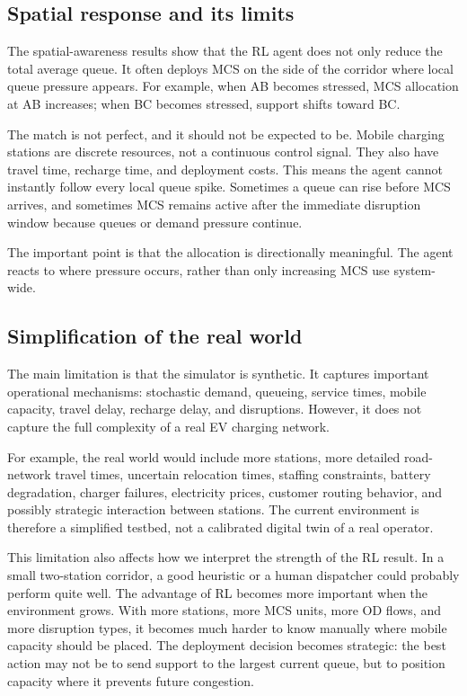 \documentclass[11pt]{article}
\begin{document}
\subsection{Spatial response and its
limits}\label{spatial-response-and-its-limits}

The spatial-awareness results show that the RL agent does not only
reduce the total average queue. It often deploys MCS on the side of the
corridor where local queue pressure appears. For example, when AB
becomes stressed, MCS allocation at AB increases; when BC becomes
stressed, support shifts toward BC.

The match is not perfect, and it should not be expected to be. Mobile
charging stations are discrete resources, not a continuous control
signal. They also have travel time, recharge time, and deployment costs.
This means the agent cannot instantly follow every local queue spike.
Sometimes a queue can rise before MCS arrives, and sometimes MCS remains
active after the immediate disruption window because queues or demand
pressure continue.

The important point is that the allocation is directionally meaningful.
The agent reacts to where pressure occurs, rather than only increasing
MCS use system-wide.

\subsection{Simplification of the real
world}\label{simplification-of-the-real-world}

The main limitation is that the simulator is synthetic. It captures
important operational mechanisms: stochastic demand, queueing, service
times, mobile capacity, travel delay, recharge delay, and disruptions.
However, it does not capture the full complexity of a real EV charging
network.

For example, the real world would include more stations, more detailed
road-network travel times, uncertain relocation times, staffing
constraints, battery degradation, charger failures, electricity prices,
customer routing behavior, and possibly strategic interaction between
stations. The current environment is therefore a simplified testbed, not
a calibrated digital twin of a real operator.

This limitation also affects how we interpret the strength of the RL
result. In a small two-station corridor, a good heuristic or a human
dispatcher could probably perform quite well. The advantage of RL
becomes more important when the environment grows. With more stations,
more MCS units, more OD flows, and more disruption types, it becomes
much harder to know manually where mobile capacity should be placed. The
deployment decision becomes strategic: the best action may not be to
send support to the largest current queue, but to position capacity
where it prevents future congestion.
\end{document}
